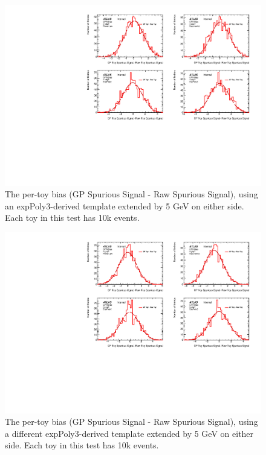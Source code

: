 \begin{figure} 
\begin{center}
  \includegraphics[width=\textwidth]{figures/background/gpr/validation/padded/ToyTest_FitSigBiases_medpT_10k_noSig}   
\caption{The per-toy bias (GP Spurious Signal - Raw Spurious Signal), using an expPoly3-derived template extended by 5 GeV on either side. Each toy in this test has 10k events.}
\label{fig:bias_padded_medpt_10k_noSig}
\end{center}
\end{figure}

\begin{figure} 
\begin{center}
  \includegraphics[width=\textwidth]{figures/background/gpr/validation/padded/ToyTest_FitSigBiases_highpT_10k_noSig}   
\caption{The per-toy bias (GP Spurious Signal - Raw Spurious Signal), using a different expPoly3-derived template extended by 5 GeV on either side. Each toy in this test has 10k events.}
\label{fig:bias_padded_highpt_10k_noSig}
\end{center}
\end{figure}

